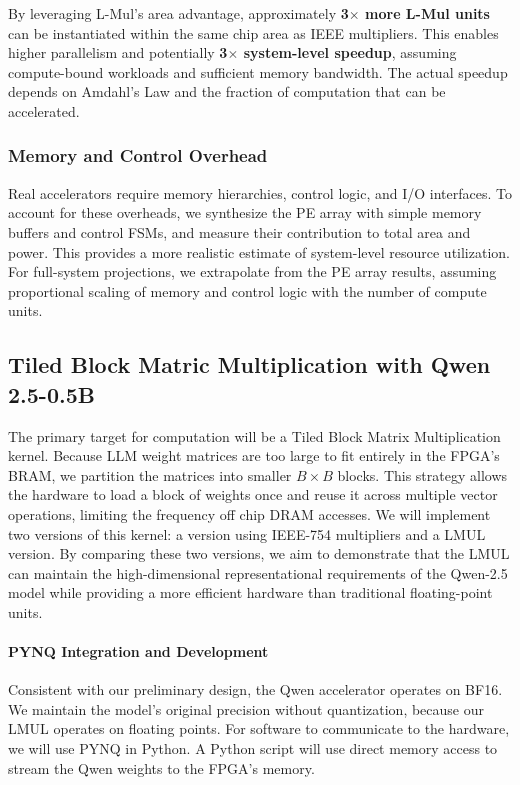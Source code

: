 \documentclass[12pt,letterpaper]{article}
\begin{document}
By leveraging L-Mul's area advantage, approximately \textbf{3$\times$ more L-Mul units} can be instantiated within the same chip area as IEEE multipliers. This enables higher parallelism and potentially \textbf{3$\times$ system-level speedup}, assuming compute-bound workloads and sufficient memory bandwidth. The actual speedup depends on Amdahl's Law and the fraction of computation that can be accelerated.

\subsubsection{Memory and Control Overhead}
Real accelerators require memory hierarchies, control logic, and I/O interfaces. To account for these overheads, we synthesize the PE array with simple memory buffers and control FSMs, and measure their contribution to total area and power. This provides a more realistic estimate of system-level resource utilization. For full-system projections, we extrapolate from the PE array results, assuming proportional scaling of memory and control logic with the number of compute units.


\subsection{Tiled Block Matric Multiplication with Qwen 2.5-0.5B}
The primary target for computation will be a Tiled Block Matrix Multiplication kernel. Because LLM weight matrices are too large to fit entirely in the FPGA's BRAM, we partition the matrices into smaller $B \times B$ blocks. This strategy allows the hardware to load a block of weights once and reuse it across multiple vector operations, limiting the frequency off chip DRAM accesses. We will implement two versions of this kernel: a version using  IEEE-754 multipliers and a LMUL version.  By comparing these two versions, we aim to demonstrate that the LMUL can maintain the high-dimensional representational requirements of the Qwen-2.5 model while providing a more efficient hardware than traditional floating-point units.

\paragraph{PYNQ Integration and Development}
Consistent with our preliminary design, the Qwen accelerator operates on BF16. We maintain the model's original precision without quantization, because our LMUL operates on floating points. For software to communicate to the hardware, we will use PYNQ in Python. A Python script will use direct memory access to stream the Qwen weights to the FPGA's memory. 
\end{document}
